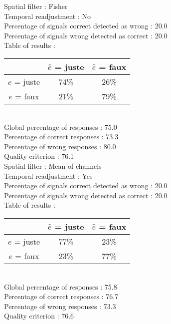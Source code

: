 Spatial filter : Fisher \\
Temporal readjustment : No \\
Percentage of signals correct detected as wrong :   20.0 \\
Percentage of signals wrong detected as correct :   20.0 \\
Table of results : \\
\begin{tabular}{|c|c|c|}
\hline				& $\hat{e}$ = juste & $\hat{e}$ = faux \\
\hline  $e$ = juste	&     74\%			&     26\%		\\
\hline  $e$ = faux	&     21\%			&     79\%		\\
\hline
\end{tabular}\\
Global percentage of responses :   75.0 \\
Percentage of correct responses :   73.3 \\
Percentage of wrong responses :   80.0 \\
Quality criterion :   76.1 \\

Spatial filter : Mean of channels \\
Temporal readjustment : Yes \\
Percentage of signals correct detected as wrong :   20.0 \\
Percentage of signals wrong detected as correct :   20.0 \\
Table of results : \\
\begin{tabular}{|c|c|c|}
\hline				& $\hat{e}$ = juste & $\hat{e}$ = faux \\
\hline  $e$ = juste	&     77\%			&     23\%		\\
\hline  $e$ = faux	&     23\%			&     77\%		\\
\hline
\end{tabular}\\
Global percentage of responses :   75.8 \\
Percentage of correct responses :   76.7 \\
Percentage of wrong responses :   73.3 \\
Quality criterion :   76.6 \\

